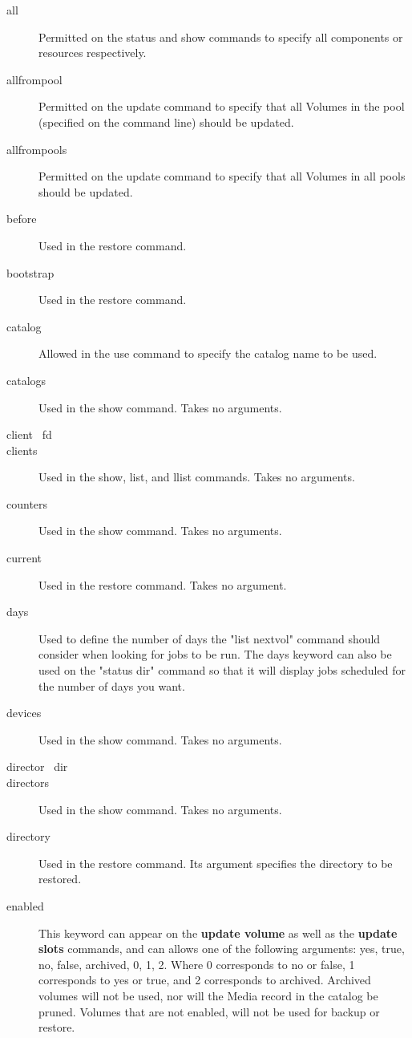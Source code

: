 \begin{description}
\item [all]
  Permitted on the status and show commands to specify all components or
  resources respectively.
\item [allfrompool]
  Permitted on the update command to specify that all Volumes in the
  pool (specified on the command line) should be updated.
\item [allfrompools]
  Permitted on the update command to specify that all Volumes in all
  pools should be updated.
\item [before]
  Used in the restore command.
\item [bootstrap]
  Used in the restore command.
\item [catalog]
  Allowed in the use command to specify the catalog name
  to be used.
\item [catalogs]
  Used in the show command. Takes no arguments.
\item [client \textbar\ fd]
\item [clients]
  Used in the show, list, and llist commands. Takes no arguments.
\item [counters]
  Used in the show command. Takes no arguments.
\item [current]
  Used in the restore command. Takes no argument.
\item [days]
  Used to define the number of days the "list nextvol" command
  should consider when looking for jobs to be run.  The days keyword
  can also be used on the "status dir" command so that it will display
  jobs scheduled for the number of days you want.
\item [devices]
  Used in the show command. Takes no arguments.
\item [director \textbar\ dir]
\item [directors]
  Used in the show command. Takes no arguments.
\item [directory]
  Used in the restore command. Its argument specifies the directory
  to be restored.
\item [enabled]
  This keyword can appear on the {\bf update volume} as well
  as the {\bf update slots} commands, and can
  allows one of the following arguments: yes, true, no, false, archived,
  0, 1, 2.  Where 0 corresponds to no or false, 1 corresponds to yes or true, and
  2 corresponds to archived.  Archived volumes will not be used, nor will
  the Media record in the catalog be pruned. Volumes that are not enabled,
  will not be used for backup or restore.

\end{description}
